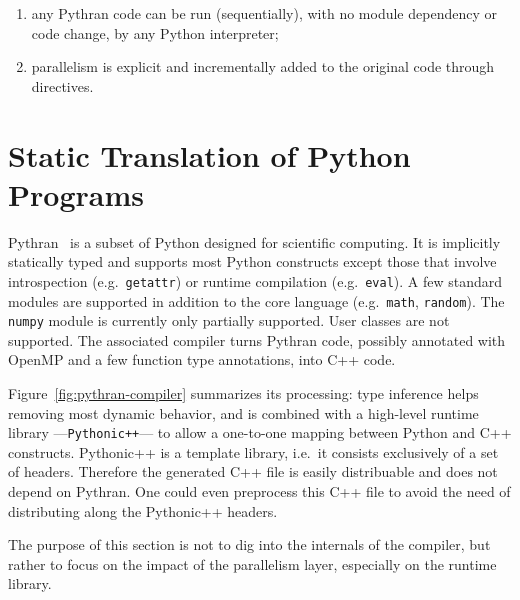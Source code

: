 \documentclass[conference]{IEEEtran}
\begin{document}
\begin{enumerate}

    \item any Pythran code can be run (sequentially), with no module dependency
        or code change, by any Python interpreter;

    \item parallelism is explicit and incrementally added to the original code
        through directives.

\end{enumerate}

\section{Static Translation of Python Programs}\label{sec:python-static}

Pythran~\cite{pythran2013} is a subset of Python designed for scientific
computing. It is implicitly statically typed and supports most Python constructs
except those that involve introspection (e.g.\ \texttt{getattr}) or runtime
compilation (e.g.\ \texttt{eval}). A few standard modules are supported in
addition to the core language (e.g.\ \texttt{math}, \texttt{random}). The
\texttt{numpy} module is currently only partially supported. User classes are
not supported. The associated compiler turns Pythran code, possibly annotated
with OpenMP and a few function type annotations, into C++ code.

Figure~\ref{fig:pythran-compiler} summarizes its processing: type inference
helps removing most dynamic behavior, and is combined with a high-level runtime
library ---\texttt{Pythonic++}--- to allow a one-to-one mapping between Python
and C++ constructs. Pythonic++ is a template library, i.e.\ it consists
exclusively of a set of headers. Therefore the generated C++ file is easily
distribuable and does not depend on Pythran. One could even preprocess this
C++ file to avoid the need of distributing along the Pythonic++ headers.

The purpose of this section is not to dig into the internals
of the compiler, but rather to focus on the impact of the parallelism layer,
especially on the runtime library.
\end{document}
